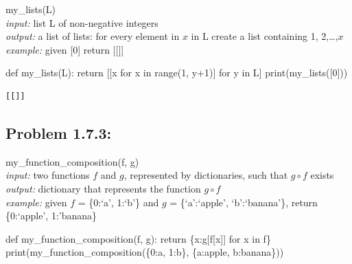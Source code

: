 \documentclass[
  letterpaper,
  DIV=11,
  numbers=noendperiod]{scrartcl}
\newenvironment{Shaded}{\begin{snugshade}}{\end{snugshade}}
\newcommand{\BuiltInTok}[1]{\textcolor[rgb]{0.00,0.23,0.31}{#1}}
\newcommand{\ControlFlowTok}[1]{\textcolor[rgb]{0.00,0.23,0.31}{#1}}
\newcommand{\DecValTok}[1]{\textcolor[rgb]{0.68,0.00,0.00}{#1}}
\newcommand{\KeywordTok}[1]{\textcolor[rgb]{0.00,0.23,0.31}{#1}}
\newcommand{\NormalTok}[1]{\textcolor[rgb]{0.00,0.23,0.31}{#1}}
\newcommand{\OperatorTok}[1]{\textcolor[rgb]{0.37,0.37,0.37}{#1}}
\newcommand{\StringTok}[1]{\textcolor[rgb]{0.13,0.47,0.30}{#1}}
\begin{document}
my\_lists(L)\\
\emph{input:} list L of non-negative integers\\
\emph{output:} a list of lists: for every element in \(x\) in L create a
list containing 1, 2,\ldots,\(x\)\\
\emph{example:} given {[}0{]} return {[}{[}{]}{]}

\begin{Shaded}
\begin{Highlighting}[numbers=left,,]
\KeywordTok{def}\NormalTok{ my\_lists(L): }\ControlFlowTok{return}\NormalTok{ [[x }\ControlFlowTok{for}\NormalTok{ x }\KeywordTok{in} \BuiltInTok{range}\NormalTok{(}\DecValTok{1}\NormalTok{, y}\OperatorTok{+}\DecValTok{1}\NormalTok{)] }\ControlFlowTok{for}\NormalTok{ y }\KeywordTok{in}\NormalTok{ L]}
\BuiltInTok{print}\NormalTok{(my\_lists([}\DecValTok{0}\NormalTok{]))}
\end{Highlighting}
\end{Shaded}

\begin{verbatim}
[[]]
\end{verbatim}

\hypertarget{problem-1.7.3}{%
\subsection{Problem 1.7.3:}\label{problem-1.7.3}}

my\_function\_composition(f, g)\\
\emph{input:} two functions \(f\) and \(g\), represented by
dictionaries, such that \(g \circ f\) exists\\
\emph{output:} dictionary that represents the function \(g \circ f\)\\
\emph{example:} given \(f\) = \{0:`a', 1:`b'\} and \(g\) =
\{`a':`apple', `b':`banana'\}, return \{0:`apple', 1:'banana\}

\begin{Shaded}
\begin{Highlighting}[numbers=left,,]
\KeywordTok{def}\NormalTok{ my\_function\_composition(f, g): }\ControlFlowTok{return}\NormalTok{ \{x:g[f[x]] }\ControlFlowTok{for}\NormalTok{ x }\KeywordTok{in}\NormalTok{ f\}}
\BuiltInTok{print}\NormalTok{(my\_function\_composition(\{}\DecValTok{0}\NormalTok{:}\StringTok{\textquotesingle{}a\textquotesingle{}}\NormalTok{, }\DecValTok{1}\NormalTok{:}\StringTok{\textquotesingle{}b\textquotesingle{}}\NormalTok{\}, \{}\StringTok{\textquotesingle{}a\textquotesingle{}}\NormalTok{:}\StringTok{\textquotesingle{}apple\textquotesingle{}}\NormalTok{, }\StringTok{\textquotesingle{}b\textquotesingle{}}\NormalTok{:}\StringTok{\textquotesingle{}banana\textquotesingle{}}\NormalTok{\}))}
\end{Highlighting}
\end{Shaded}
\end{document}
